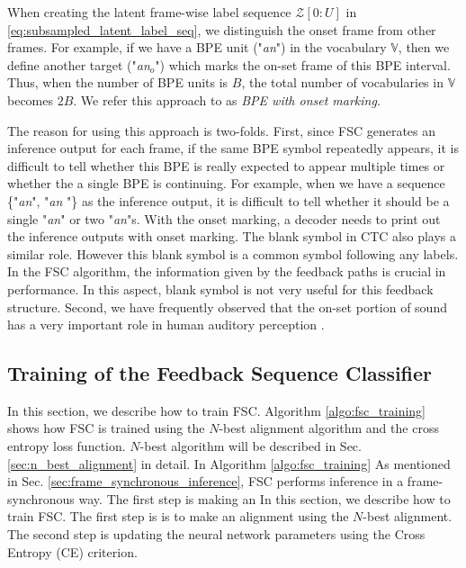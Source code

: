 \documentclass{article}
\begin{document}
When creating the latent frame-wise label sequence $\mathcal{Z}[0:U]$ 
in \eqref{eq:subsampled_latent_label_seq}, we distinguish the onset frame
from other frames.  For example, if we have a BPE unit
("{\it an}") in the vocabulary $\mathbb{V}$, then we define another
target ("{\it an$_o$}") which marks the on-set frame of this BPE
interval. Thus, when the number of BPE units is $B$, the total
number of vocabularies in $\mathbb{V}$ becomes $2B$.
We refer this approach to as {\it BPE with onset marking}.

The reason for using this approach is two-folds. First, since FSC
generates an inference output for each frame, if the same
BPE symbol repeatedly appears, it is difficult to tell whether 
this BPE is really expected to appear multiple times or whether 
the a single BPE is continuing. For example, when we have 
a sequence \{"{\it an}", "{\it an} "\}
as the inference output, it is difficult to tell whether it should be a single
"{\it an}" or two "{\it an}"s. With the onset marking,
a decoder needs to print out the inference outputs with onset marking. 
The blank symbol in CTC also plays a similar role. However this blank symbol
is a common symbol following any labels. In the FSC algorithm, the information
given by the feedback paths is crucial in performance. In this aspect,
blank symbol is not very useful for this feedback structure. 
Second, we have frequently observed that the on-set portion of sound
has a very important role in human auditory perception 
\cite{C_Kim_INTERSPEECH_2014_2}.











\subsection{Training of the Feedback Sequence Classifier}
In this section, we describe how to train FSC.  Algorithm 
\ref{algo:fsc_training} shows how FSC is trained using the 
$N$-best alignment algorithm and the cross entropy loss function. 
$N$-best algorithm will be described 
in Sec. \ref{sec:n_best_alignment} in detail.
In Algorithm \ref{algo:fsc_training}  
As mentioned in Sec. 
\ref{sec:frame_synchronous_inference}, FSC performs inference
in a frame-synchronous way.
The first step is making an 
In this section, we describe how to train FSC. The first step is 
is to make an alignment using the $N$-best alignment. The second step is updating the
neural network parameters using the Cross Entropy (CE) criterion. 
\end{document}
